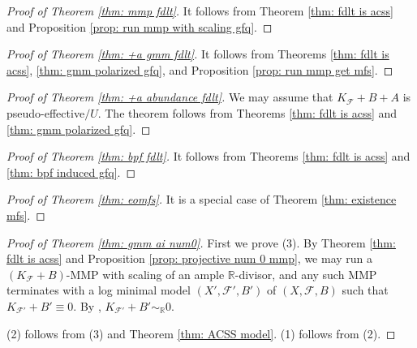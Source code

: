 \documentclass[11pt]{amsart}
\numberwithin{equation}{section}
\newcommand{\Rr}{\mathbb{R}}
\newcommand{\Ff}{\mathcal{F}}
\theoremstyle{definition}
\theoremstyle{definition}
\theoremstyle{definition}
\begin{document}
\begin{proof}[Proof of Theorem \ref{thm: mmp fdlt}]
    It follows from Theorem \ref{thm: fdlt is acss} and Proposition \ref{prop: run mmp with scaling gfq}.
\end{proof}

\begin{proof}[Proof of Theorem \ref{thm: +a gmm fdlt}]
    It follows from Theorems \ref{thm: fdlt is acss}, \ref{thm: gmm polarized gfq}, and Proposition \ref{prop: run mmp get mfs}.
\end{proof}


\begin{proof}[Proof of Theorem \ref{thm: +a abundance fdlt}]
    We may assume that $K_{\Ff}+B+A$ is pseudo-effective$/U$. The theorem follows from  Theorems \ref{thm: fdlt is acss} and \ref{thm: gmm polarized gfq}.
\end{proof}

\begin{proof}[Proof of Theorem \ref{thm: bpf fdlt}]
   It follows from Theorems \ref{thm: fdlt is acss} and \ref{thm: bpf induced gfq}.
\end{proof}

\begin{proof}[Proof of Theorem \ref{thm: eomfs}]
    It is a special case of Theorem \ref{thm: existence mfs}.
\end{proof}

\begin{proof}[Proof of Theorem \ref{thm: gmm ai num0}] 
First we prove (3). By Theorem \ref{thm: fdlt is acss} and Proposition \ref{prop: projective num 0 mmp}, we may run a $(K_{\Ff}+B)$-MMP with scaling of an
ample $\Rr$-divisor, and any such MMP terminates with a log minimal model $(X',\Ff',B')$ of $(X,\Ff,B)$ such that $K_{\Ff'}+B'\equiv 0$. By \cite[Theorem 1.4]{DLM23}, $K_{\Ff'}+B'\sim_\Rr 0$. 

(2) follows from (3) and Theorem \ref{thm:  ACSS model}. (1) follows from (2).
\end{proof}
\end{document}

